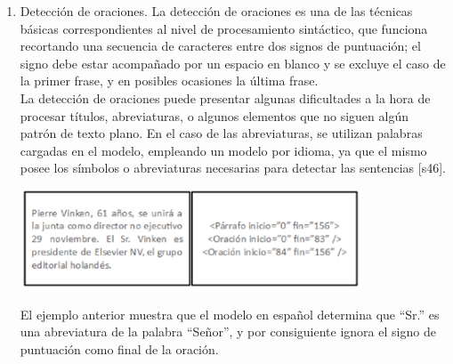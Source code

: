 \begin{enumerate}
    \item Detección de oraciones. La detección de oraciones es una de las técnicas básicas correspondientes al  nivel de procesamiento sintáctico, que funciona recortando una secuencia de caracteres entre dos signos de puntuación; el signo debe estar acompañado por un espacio en blanco y se excluye el caso de la primer frase, y en posibles ocasiones la última frase.\\
    
La detección de oraciones puede presentar algunas dificultades a la hora de procesar títulos, abreviaturas, o algunos elementos que no siguen algún patrón de texto plano. En el caso de las abreviaturas, se utilizan palabras cargadas en el modelo, empleando un modelo por idioma, ya que el mismo posee los símbolos o abreviaturas necesarias para detectar las sentencias [s46].
\begin{center}
    \includegraphics[width=0.8\textwidth]{Images/lib.png}
\end{center}
El ejemplo anterior muestra que el modelo en español determina que “Sr.” es una abreviatura de la palabra “Señor”, y por consiguiente ignora el signo de puntuación como final de la oración.


\end{enumerate}
